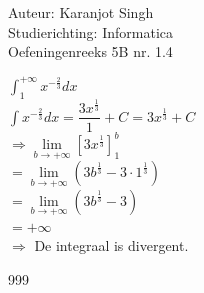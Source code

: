 \documentclass[a4paper]{article}
\begin{document}
\noindent \large Auteur: Karanjot Singh \\
\noindent \large Studierichting: Informatica \\
\noindent \large Oefeningenreeks 5B nr. 1.4 \\

\normalsize

$\displaystyle\int_1^{+\infty} x^{-\tfrac{2}{3}} dx$ \\

$\displaystyle\int x^{-\tfrac{2}{3}} dx = \dfrac{3x^{\tfrac{1}{3}}}{1} + C = 3x^{\tfrac{1}{3}} + C$ \\

$\Rightarrow  \lim\limits_{b \rightarrow +\infty} \left[ 3x^{\tfrac{1}{3}} \right]_1^b$ \\

$= \lim\limits_{b \rightarrow +\infty} \left( 3b^{\tfrac{1}{3}} - 3 \cdot 1^{\tfrac{1}{3}} \right)$ \\

$= \lim\limits_{b \rightarrow +\infty} \left( 3b^{\tfrac{1}{3}} - 3 \right)$ \\

$= +\infty$ \\

$\Rightarrow$ De integraal is divergent. \\

\begin{thebibliography}{999}
\end{thebibliography}
\end{document}
